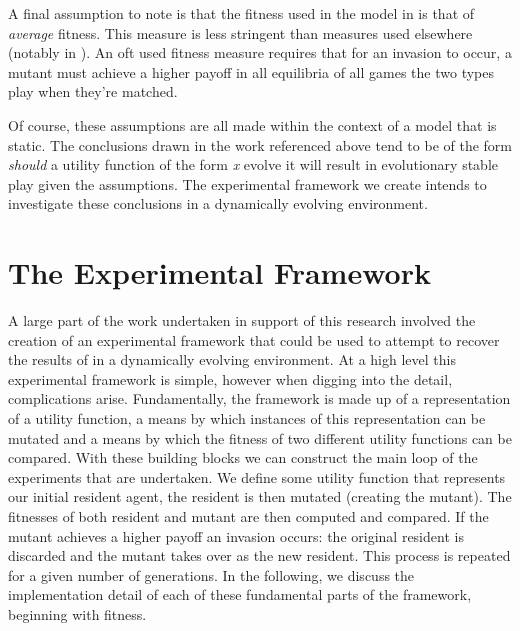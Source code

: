 \documentclass[11pt]{book}
\newcommand*{\np}{\par\noindent\newline}
\begin{document}
\np A final assumption to note is that the fitness used in the model in \citet{alger_generalization_2012} is that of \textit{average} fitness.
This measure is less stringent than measures used elsewhere (notably in \citet{alger_homo_2013}). 
An oft used fitness measure requires that for an invasion to occur, a mutant must achieve a higher payoff in all equilibria of all games the two types play when they're matched.

\np Of course, these assumptions are all made within the context of a model that is static.
The conclusions drawn in the work referenced above tend to be of the form \textit{should} a utility function of the form \textit{x} evolve it will result in evolutionary stable play given the assumptions.
The experimental framework we create intends to investigate these conclusions in a dynamically evolving environment.



\section{The Experimental Framework}
A large part of the work undertaken in support of this research involved the creation of an experimental framework that could be used to attempt to recover the results of \citet{alger_generalization_2012} in a dynamically evolving environment.
At a high level this experimental framework is simple, however when digging into the detail, complications arise.
Fundamentally, the framework is made up of a representation of a utility function, 
a means by which instances of this representation can be mutated and a means by which the fitness of two different utility functions can be compared.
With these building blocks we can construct the main loop of the experiments that are undertaken.
We define some utility function that represents our initial resident agent, the resident is then mutated (creating the mutant). 
The fitnesses of both resident and mutant are then computed and compared. 
If the mutant achieves a higher payoff an invasion occurs: the original resident is discarded and the mutant takes over as the new resident.
This process is repeated for a given number of generations.
In the following, we discuss the implementation detail of each of these fundamental parts of the framework, beginning with fitness.
\end{document}

